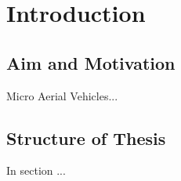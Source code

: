 \section{Introduction}

\subsection{Aim and Motivation}

Micro Aerial Vehicles... 


\subsection{Structure of Thesis}

In section ...



%
%
%
%
%

